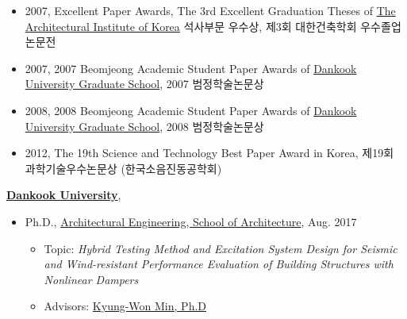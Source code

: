 \documentclass[10pt,a4paper,ragged2e]{altacv}
\begin{document}
\clearpage
\begin{fullwidth}

\nocite{*}
\begin{itemize}
\item 2007, Excellent Paper Awards, The 3rd Excellent Graduation Theses of \href{http://www.aik.or.kr}{The Architectural Institute of Korea} 석사부문 우수상, 제3회 대한건축학회 우수졸업논문전
\item 2007, 2007 Beomjeong Academic Student Paper Awards of \href{http://cms.dankook.ac.kr/web/grad}{Dankook University Graduate School}, 2007 범정학술논문상
\item 2008, 2008 Beomjeong Academic Student Paper Awards of \href{http://cms.dankook.ac.kr/web/grad}{Dankook University Graduate School}, 2008 범정학술논문상
\item 2012, The 19th Science and Technology Best Paper Award in Korea, 제19회 과학기술우수논문상 (한국소음진동공학회)
\end{itemize}


\nocite{*}
\href{http://www.dankook.ac.kr/}{\textbf{Dankook University}},
\begin{itemize}
\item Ph.D.,
        \href{http://cms.dankook.ac.kr/web/archi}
             {Architectural Engineering, School of Architecture},
             Aug. 2017
        \begin{itemize}
        \item Topic: \emph{Hybrid Testing Method and Excitation System Design for Seismic and Wind-resistant Performance Evaluation of Building Structures with Nonlinear Dampers}
        \item Advisors:
              \href{http://cms.dankook.ac.kr/web/archi/-16?p_p_id=DeptInfo_WAR_empInfoportlet&p_p_lifecycle=0&p_p_state=normal&p_p_mode=view&p_p_col_id=column-2&p_p_col_count=1&_DeptInfo_WAR_empInfoportlet_empId=2zEyEnhbhLlys2HRljBFWg%3D%3D&_DeptInfo_WAR_empInfoportlet_action=view_message}
                   {Kyung-Won Min, Ph.D}
        \end{itemize}


\end{itemize}
\end{fullwidth}
\end{document}
